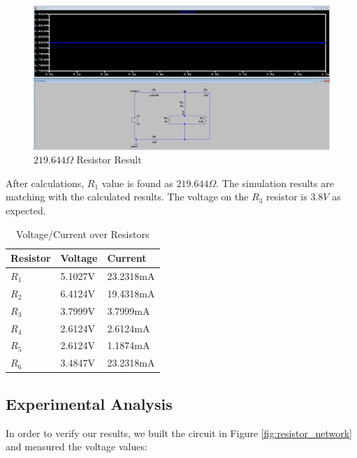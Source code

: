 \begin{figure}[h]
    \centering
    \includegraphics[width=1\textwidth]{assets/p1-res.png}
    \caption{$219.644\Omega$ Resistor Result}
    \label{fig:p1_result}
\end{figure}

After calculations, $R_1$ value is found as $219.644\Omega$. The simulation results are matching with the calculated results. The voltage on the $R_3$ resistor is $3.8V$ as expected.

\begin{table}[h]
    \centering
    \begin{tabular}{|l|l|l|}
        \hline
        \textbf{Resistor} & \textbf{Voltage} & \textbf{Current} \\ \hline
        $R_1$              & 5.1027V          & 23.2318mA        \\ \hline
        $R_2$              & 6.4124V          & 19.4318mA        \\ \hline
        $R_3$              & 3.7999V          & 3.7999mA         \\ \hline
        $R_4$              & 2.6124V          & 2.6124mA         \\ \hline
        $R_5$              & 2.6124V          & 1.1874mA         \\ \hline
        $R_6$              & 3.4847V          & 23.2318mA        \\ \hline
    \end{tabular}
    \caption{Voltage/Current over Resistors}
\end{table}

\newpage
\thispagestyle{plain}

\subsection{Experimental Analysis}
In order to verify our results, we built the circuit in Figure \ref{fig:resistor_network} and measured the voltage values:


